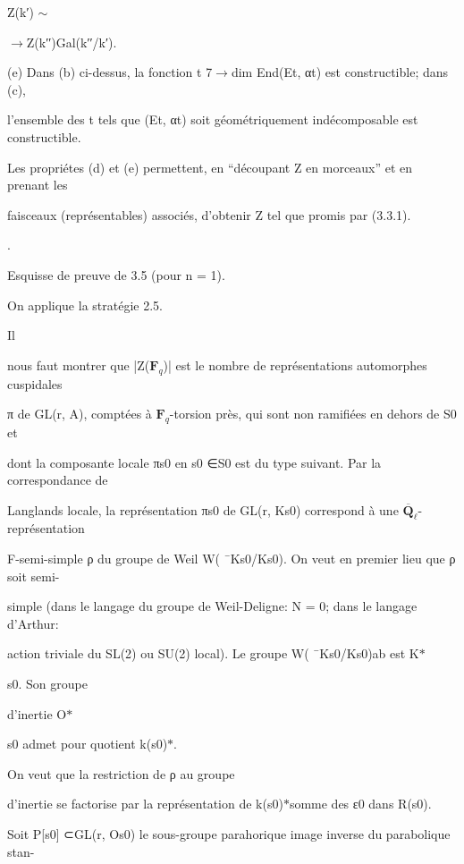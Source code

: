 \documentclass[11pt]{article}
\begin{document}
\noindent Z(k′) \(\sim\)\par
\noindent \(\to\)Z(k′′)Gal(k′′/k′).\par
\noindent (e) Dans (b) ci-dessus, la fonction t 7\(\to\)dim End(Et, αt) est constructible; dans (c),\par
\noindent l’ensemble des t tels que (Et, αt) soit géométriquement indécomposable est constructible.\par
\medskip
\noindent Les propriétes (d) et (e) permettent, en “découpant Z en morceaux” et en prenant les\par
\noindent faisceaux (représentables) associés, d’obtenir Z tel que promis par (3.3.1).\par
{}.\par
\noindent Esquisse de preuve de 3.5 (pour n = 1).\par
\noindent On applique la stratégie 2.5.\par
\noindent Il\par
\noindent nous faut montrer que |Z(\(\mathbf F_q\))| est le nombre de représentations automorphes cuspidales\par
\noindent π de GL(r, A), comptées à \(\mathbf F_q\)-torsion près, qui sont non ramifiées en dehors de S0 et\par
\noindent dont la composante locale πs0 en s0 ∈S0 est du type suivant. Par la correspondance de\par
\noindent Langlands locale, la représentation πs0 de GL(r, Ks0) correspond à une \(\overline{\mathbf Q}_{\ell}\)-représentation\par
\noindent F-semi-simple ρ du groupe de Weil W( ¯Ks0/Ks0). On veut en premier lieu que ρ soit semi-\par
\noindent simple (dans le langage du groupe de Weil-Deligne: N = 0; dans le langage d’Arthur:\par
\noindent action triviale du SL(2) ou SU(2) local). Le groupe W( ¯Ks0/Ks0)ab est K\(*\)\par
\noindent s0. Son groupe\par
\noindent d’inertie O\(*\)\par
\noindent s0 admet pour quotient k(s0)\(*\).\par
\noindent On veut que la restriction de ρ au groupe\par
\noindent d’inertie se factorise par la représentation de k(s0)\(*\)somme des ε0 dans R(s0).\par
\noindent Soit P[s0] ⊂GL(r, Os0) le sous-groupe parahorique image inverse du parabolique stan-\par
\end{document}
